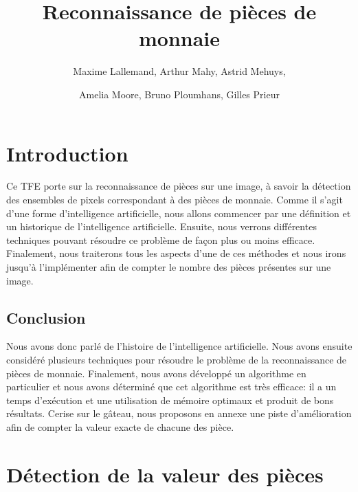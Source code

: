 \documentclass[12pt,titlepage]{article}
\begin{document}
\title{Reconnaissance de pièces de monnaie}
\author{Maxime Lallemand, Arthur Mahy, Astrid Mehuys, \and Amelia Moore, Bruno Ploumhans, Gilles Prieur}

\maketitle

\tableofcontents
\newpage

\section*{Introduction}
Ce TFE porte sur la reconnaissance de pièces sur une image, à savoir la détection des ensembles de pixels correspondant à des pièces de monnaie. Comme il s'agit d'une forme d'intelligence artificielle, nous allons commencer par une définition et un historique de l'intelligence artificielle. Ensuite, nous verrons différentes techniques pouvant résoudre ce problème de façon plus ou moins efficace. Finalement, nous traiterons tous les aspects d'une de ces méthodes et nous irons jusqu'à l'implémenter afin de compter le nombre des pièces présentes sur une image.







\subsection*{Conclusion}
Nous avons donc parlé de l'histoire de l'intelligence artificielle. Nous avons ensuite considéré plusieurs techniques pour résoudre le problème de la reconnaissance de pièces de monnaie. Finalement, nous avons développé un algorithme en particulier et nous avons déterminé que cet algorithme est très efficace: il a un temps d'exécution et une utilisation de mémoire optimaux et produit de bons résultats. Cerise sur le gâteau, nous proposons en annexe une piste d'amélioration afin de compter la valeur exacte de chacune des pièce.

\appendix

\section{Détection de la valeur des pièces}
\end{document}
